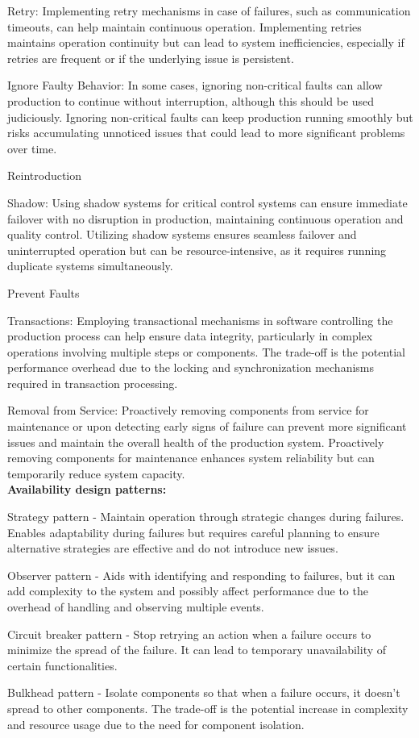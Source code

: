 Retry: Implementing retry mechanisms in case of failures, such as communication timeouts, can help maintain continuous operation. Implementing retries maintains operation continuity but can lead to system inefficiencies, especially if retries are frequent or if the underlying issue is persistent.

Ignore Faulty Behavior: In some cases, ignoring non-critical faults can allow production to continue without interruption, although this should be used judiciously. Ignoring non-critical faults can keep production running smoothly but risks accumulating unnoticed issues that could lead to more significant problems over time.

Reintroduction

Shadow: Using shadow systems for critical control systems can ensure immediate failover with no disruption in production, maintaining continuous operation and quality control. Utilizing shadow systems ensures seamless failover and uninterrupted operation but can be resource-intensive, as it requires running duplicate systems simultaneously.

Prevent Faults

Transactions: Employing transactional mechanisms in software controlling the production process can help ensure data integrity, particularly in complex operations involving multiple steps or components. The trade-off is the potential performance overhead due to the locking and synchronization mechanisms required in transaction processing.

Removal from Service: Proactively removing components from service for maintenance or upon detecting early signs of failure can prevent more significant issues and maintain the overall health of the production system. Proactively removing components for maintenance enhances system reliability but can temporarily reduce system capacity. \\


\textbf{Availability design patterns:}

Strategy pattern - Maintain operation through strategic changes during failures. Enables adaptability during failures but requires careful planning to ensure alternative strategies are effective and do not introduce new issues.

Observer pattern - Aids with identifying and responding to failures, but it can add complexity to the system and possibly affect performance due to the overhead of handling and observing multiple events.

Circuit breaker pattern - Stop retrying an action when a failure occurs to minimize the spread of the failure. It can lead to temporary unavailability of certain functionalities.

Bulkhead pattern - Isolate components so that when a failure occurs, it doesn’t spread to other components. The trade-off is the potential increase in complexity and resource usage due to the need for component isolation.


